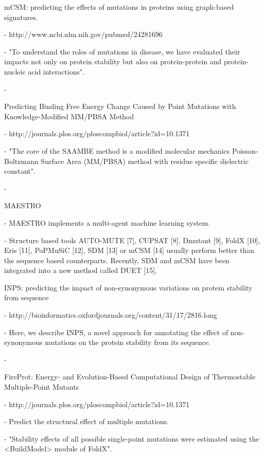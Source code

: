 mCSM: predicting the effects of mutations in proteins using graph-based signatures.

  - http://www.ncbi.nlm.nih.gov/pubmed/24281696

  - "To understand the roles of mutations in disease, we have evaluated their impacts not only on protein stability but also on protein-protein and protein-nucleic acid interactions".

  - \cite{pires_mcsm:_2014}


Predicting Binding Free Energy Change Caused by Point Mutations with Knowledge-Modified MM/PBSA Method

  - http://journals.plos.org/ploscompbiol/article?id=10.1371%

  - "The core of the SAAMBE method is a modified molecular mechanics Poisson-Boltzmann Surface Area (MM/PBSA) method with residue specific dielectric constant".

  - \cite{petukh_predicting_2015}


MAESTRO \cite{laimer_maestro_2015}


  - MAESTRO implements a multi-agent machine learning system.

  - Structure based tools AUTO-MUTE [7], CUPSAT [8], Dmutant [9], FoldX [10], Eris [11], PoPMuSiC [12], SDM [13] or mCSM [14] usually perform better than the sequence based counterparts. Recently, SDM and mCSM have been integrated into a new method called DUET [15].


INPS: predicting the impact of non-synonymous variations on protein stability from sequence

  - http://bioinformatics.oxfordjournals.org/content/31/17/2816.long

  - Here, we describe INPS, a novel approach for annotating the effect of non-synonymous mutations on the protein stability from its sequence.

  - \cite{fariselli_inps:_2015}


FireProt: Energy- and Evolution-Based Computational Design of Thermostable Multiple-Point Mutants

  - http://journals.plos.org/ploscompbiol/article?id=10.1371%

  - Predict the structural effect of multiple mutations.

  - "Stability effects of all possible single-point mutations were estimated using the <BuildModel> module of FoldX".

